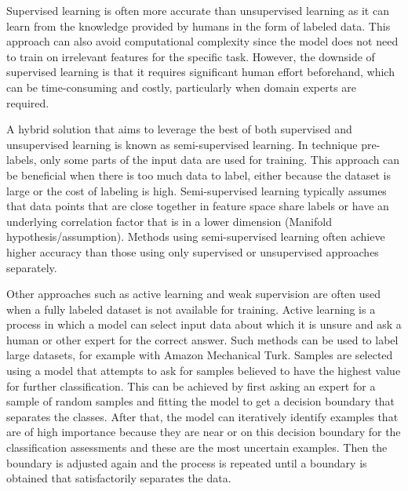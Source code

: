 
        Supervised learning is often more accurate than unsupervised learning as it can learn from the knowledge provided by humans in the form of labeled data. This approach can also avoid computational complexity since the model does not need to train on irrelevant features for the specific task. However, the downside of supervised learning is that it requires significant human effort beforehand, which can be time-consuming and costly, particularly when domain experts are required.

        A hybrid solution that aims to leverage the best of both supervised and unsupervised learning is known as semi-supervised learning. In technique pre-labels, only some parts of the input data are used for training. This approach can be beneficial when there is too much data to label, either because the dataset is large or the cost of labeling is high. Semi-supervised learning typically assumes that data points that are close together in feature space share labels or have an underlying correlation factor that is in a lower dimension (Manifold hypothesis/assumption). Methods using semi-supervised learning often achieve higher accuracy than those using only supervised or unsupervised approaches separately.
        
        Other approaches such as active learning and weak supervision are often used when a fully labeled dataset is not available for training. Active learning is a process in which a model can select input data about which it is unsure and ask a human or other expert for the correct answer. Such methods can be used to label large datasets, for example with Amazon Mechanical Turk. Samples are selected using a model that attempts to ask for samples believed to have the highest value for further classification. This can be achieved by first asking an expert for a sample of random samples and fitting the model to get a decision boundary that separates the classes. After that, the model can iteratively identify examples that are of high importance because they are near or on this decision boundary for the classification assessments and these are the most uncertain examples. Then the boundary is adjusted again and the process is repeated until a boundary is obtained that satisfactorily separates the data.
        
